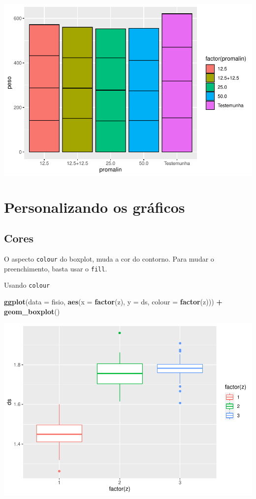 \documentclass[]{book}
\newenvironment{Shaded}{\begin{snugshade}}{\end{snugshade}}
\newcommand{\DataTypeTok}[1]{\textcolor[rgb]{0.13,0.29,0.53}{#1}}
\newcommand{\KeywordTok}[1]{\textcolor[rgb]{0.13,0.29,0.53}{\textbf{#1}}}
\newcommand{\NormalTok}[1]{#1}
\newcommand{\OperatorTok}[1]{\textcolor[rgb]{0.81,0.36,0.00}{\textbf{#1}}}
\newcommand{\StringTok}[1]{\textcolor[rgb]{0.31,0.60,0.02}{#1}}
\begin{document}
\includegraphics{TudodoR_files/figure-latex/unnamed-chunk-199-1.pdf}

\hypertarget{personalizando-os-graficos-1}{%
\section{Personalizando os gráficos}\label{personalizando-os-graficos-1}}

\hypertarget{cores-1}{%
\subsection{Cores}\label{cores-1}}

O aspecto \texttt{colour} do boxplot, muda a cor do contorno. Para mudar o preenchimento, basta usar o \texttt{fill}.

Usando \texttt{colour}

\begin{Shaded}
\begin{Highlighting}[]
\KeywordTok{ggplot}\NormalTok{(}\DataTypeTok{data =}\NormalTok{ fisio, }\KeywordTok{aes}\NormalTok{(}\DataTypeTok{x =} \KeywordTok{factor}\NormalTok{(z), }\DataTypeTok{y =}\NormalTok{ ds, }\DataTypeTok{colour =} \KeywordTok{factor}\NormalTok{(z))) }\OperatorTok{+}
\StringTok{  }\KeywordTok{geom_boxplot}\NormalTok{()}
\end{Highlighting}
\end{Shaded}

\includegraphics{TudodoR_files/figure-latex/unnamed-chunk-200-1.pdf}
\end{document}
